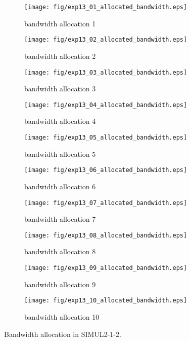 	\begin{figure}
		\begin{center}
			\begin{subfigure}[b]{0.32\textwidth}
				\texttt{[image: fig/exp13\_01\_allocated\_bandwidth.eps]}
				\caption{bandwidth allocation 1}
				\label{figure:simul2_1_2_b_a}
			\end{subfigure}
			\begin{subfigure}[b]{0.32\textwidth}
				\texttt{[image: fig/exp13\_02\_allocated\_bandwidth.eps]}
				\caption{bandwidth allocation 2}
				\label{figure:simul2_1_2_b_b}
			\end{subfigure}
			\begin{subfigure}[b]{0.32\textwidth}
				\texttt{[image: fig/exp13\_03\_allocated\_bandwidth.eps]}
				\caption{bandwidth allocation 3}
				\label{figure:simul2_1_2_b_c}
			\end{subfigure}
			\begin{subfigure}[b]{0.32\textwidth}
				\texttt{[image: fig/exp13\_04\_allocated\_bandwidth.eps]}
				\caption{bandwidth allocation 4}
				\label{figure:simul2_1_2_b_d}
			\end{subfigure}
			\begin{subfigure}[b]{0.32\textwidth}
				\texttt{[image: fig/exp13\_05\_allocated\_bandwidth.eps]}
				\caption{bandwidth allocation 5}
				\label{figure:simul2_1_2_b_e}
			\end{subfigure}
			\begin{subfigure}[b]{0.32\textwidth}
				\texttt{[image: fig/exp13\_06\_allocated\_bandwidth.eps]}
				\caption{bandwidth allocation 6}
				\label{figure:simul2_1_2_b_f}
			\end{subfigure}
			\begin{subfigure}[b]{0.32\textwidth}
				\texttt{[image: fig/exp13\_07\_allocated\_bandwidth.eps]}
				\caption{bandwidth allocation 7}
				\label{figure:simul2_1_2_b_g}
			\end{subfigure}
			\begin{subfigure}[b]{0.32\textwidth}
				\texttt{[image: fig/exp13\_08\_allocated\_bandwidth.eps]}
				\caption{bandwidth allocation 8}
				\label{figure:simul2_1_2_b_h}
			\end{subfigure}
			\begin{subfigure}[b]{0.32\textwidth}
				\texttt{[image: fig/exp13\_09\_allocated\_bandwidth.eps]}
				\caption{bandwidth allocation 9}
				\label{figure:simul2_1_2_b_i}
			\end{subfigure}
			\begin{subfigure}[b]{0.32\textwidth}
				\texttt{[image: fig/exp13\_10\_allocated\_bandwidth.eps]}
				\caption{bandwidth allocation 10}
				\label{figure:simul2_1_2_b_j}
			\end{subfigure}
			\caption{Bandwidth allocation in SIMUL2-1-2.}
			\label{figure:simul2_1_2_ba}
		\end{center}
	\end{figure}


